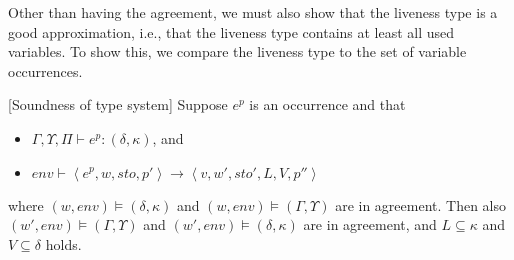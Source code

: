 \documentclass[../../master.tex]{subfiles}
\begin{document}
Other than having the agreement, we must also show that the liveness type is a good approximation, i.e., that the liveness type contains at least all used variables.
To show this, we compare the liveness type to the set of variable occurrences.


\begin{theorem}{[Soundness of type system]}
	Suppose $e^p$ is an occurrence and that
	\begin{itemize}
		\item $\Gamma,\Upsilon,\Pi\vdash e^p : (\delta,\kappa)$, and 
		\item $env\vdash\left\langle e^p,w,sto,p'\right\rangle\rightarrow\left\langle v,w',sto',L,V,p''\right\rangle$
	\end{itemize}
	where $(w,env)\models(\delta,\kappa)$ and $(w,env)\models(\Gamma,\Upsilon)$ are in agreement.
	Then also $(w',env)\models(\Gamma,\Upsilon)$ and $(w',env)\models(\delta,\kappa)$ are in agreement, and $L\subseteq\kappa$ and $V\subseteq\delta$ holds.
\end{theorem}
\end{document}
